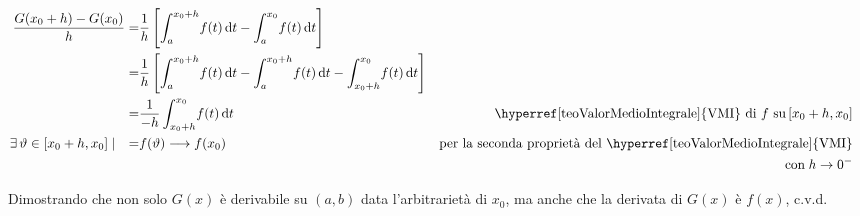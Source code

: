 \documentclass[../../analisi1]{subfiles}
\begin{document}
                            \begin{align*}
                                \frac{G(x_0+h) - G(x_0)}{h} =& \frac{1}{h} \left[ \int_a^{x_0+h} \! f(t) \, \mathrm{d}t - \int_a^{x_0} \! f(t) \, \mathrm{d}t \right] \\
                                                            =& \frac{1}{h} \left[ \int_a^{x_0+h} \! f(t) \, \mathrm{d}t - \int_a^{x_0+h} \! f(t) \, \mathrm{d}t - \int_{x_0+h}^{x_0} \! f(t) \, \mathrm{d}t \right] \\
                                                            =& \frac{1}{-h} \int_{x_0+h}^{x_0} \! f(t) \, \mathrm{d}t & \text{\hyperref[teoValorMedioIntegrale]{VMI} di \(f\) su} \, [x_0 + h, x_0]\\
                                \exists \, \vartheta \in [x_0+h, x_0] \mid \quad =& f(\vartheta) \longrightarrow f(x_0)          & \text{per la seconda proprietà del \hyperref[teoValorMedioIntegrale]{VMI}}& \\
                                &                            &  \text{con} \; h \rightarrow 0^-&
                            \end{align*}
                            
                            Dimostrando che non solo \(G(x)\) è derivabile su \((a,b)\) data l'arbitrarietà di \(x_0\), 
                            ma anche che la derivata di \(G(x)\) è \(f(x)\), c.v.d.          
\end{document}
